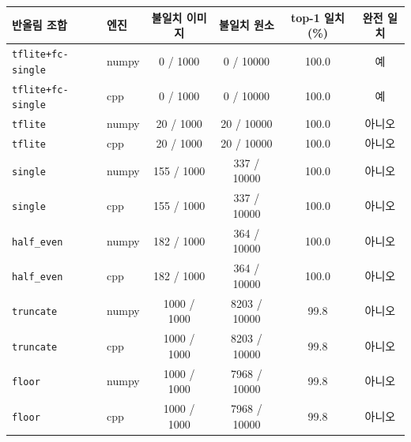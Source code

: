 \setlength{\tabcolsep}{4pt}
\begin{tabular}{llcccc}
\toprule
반올림 조합 & 엔진 & 불일치 이미지 & 불일치 원소 & top-1 일치(\%) & 완전 일치 \\
\midrule
\texttt{tflite+fc-single} & numpy & 0 / 1000 & 0 / 10000 & 100.0 & 예 \\
\texttt{tflite+fc-single} & cpp & 0 / 1000 & 0 / 10000 & 100.0 & 예 \\
\texttt{tflite} & numpy & 20 / 1000 & 20 / 10000 & 100.0 & 아니오 \\
\texttt{tflite} & cpp & 20 / 1000 & 20 / 10000 & 100.0 & 아니오 \\
\texttt{single} & numpy & 155 / 1000 & 337 / 10000 & 100.0 & 아니오 \\
\texttt{single} & cpp & 155 / 1000 & 337 / 10000 & 100.0 & 아니오 \\
\texttt{half\_even} & numpy & 182 / 1000 & 364 / 10000 & 100.0 & 아니오 \\
\texttt{half\_even} & cpp & 182 / 1000 & 364 / 10000 & 100.0 & 아니오 \\
\texttt{truncate} & numpy & 1000 / 1000 & 8203 / 10000 & 99.8 & 아니오 \\
\texttt{truncate} & cpp & 1000 / 1000 & 8203 / 10000 & 99.8 & 아니오 \\
\texttt{floor} & numpy & 1000 / 1000 & 7968 / 10000 & 99.8 & 아니오 \\
\texttt{floor} & cpp & 1000 / 1000 & 7968 / 10000 & 99.8 & 아니오 \\
\bottomrule
\end{tabular}
